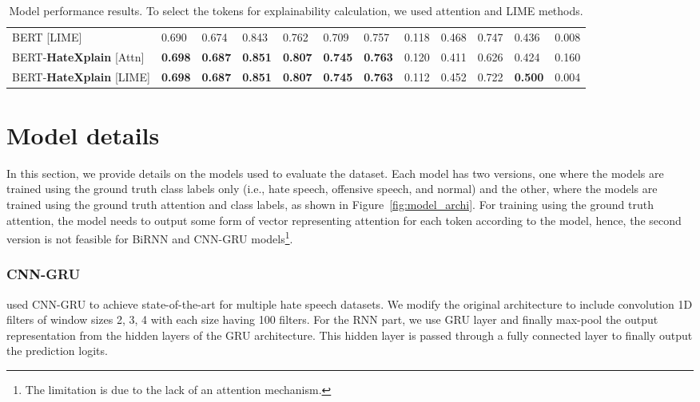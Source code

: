 \documentclass[letterpaper]{article} \usepackage{aaai21}  \usepackage{times}  \usepackage{helvet} \usepackage{courier}  \usepackage[hyphens]{url}  \usepackage{graphicx} \urlstyle{rm} \def\UrlFont{\rm}  \usepackage{natbib}  \usepackage{caption}
\begin{document}
\begin{table*}[htb!]
{\begin{tabular}{l| lll | lll | lll|ll}
BERT [LIME]         &0.690 &0.674              &0.843           &0.762              &0.709              &0.757              &0.118             &0.468              &0.747          &0.436          &0.008\\
BERT-{\bf{HateXplain}} [Attn]&\textbf{0.698}        &\textbf{0.687}     &\textbf{0.851}  &\textbf{0.807}     &\textbf{0.745}     &\textbf{0.763}     &0.120             &0.411              &0.626          &0.424          &0.160   \\
BERT-{\bf{HateXplain}} [LIME]&\textbf{0.698}        &\textbf{0.687}     &\textbf{0.851}  &\textbf{0.807}     &\textbf{0.745}     &\textbf{0.763}     &0.112             &0.452              &0.722          &\textbf{0.500} &0.004   \\
\hline
\end{tabular}}\caption{Model performance results. To select the tokens for explainability calculation, we used attention and LIME methods.}
\label{tab:results}
\end{table*}






\section{Model details}
\label{modeldetails}
In this section, we provide details on the models used to evaluate the dataset. Each model has two versions, one where the models are trained using the ground truth class labels only (i.e., hate speech, offensive speech, and normal) and the other, where the models are trained using the ground truth attention and class labels, as shown in Figure~\ref{fig:model_archi}. For training using the ground truth attention, the model needs to output some form of vector representing attention for each token according to the model, hence, the second version is not feasible for BiRNN and CNN-GRU models\footnote{The limitation is due to the lack of an attention mechanism.}.


\subsubsection{CNN-GRU}
\citet{zhang2018detecting} used CNN-GRU to achieve state-of-the-art for multiple hate speech datasets. We modify the original architecture to include convolution 1D filters of window sizes 2, 3, 4 with each size having 100 filters. For the RNN part, we use GRU layer and finally max-pool the output representation from the hidden layers of the GRU architecture. This hidden layer is passed through a fully connected layer to finally output the prediction logits. 
\end{document}
